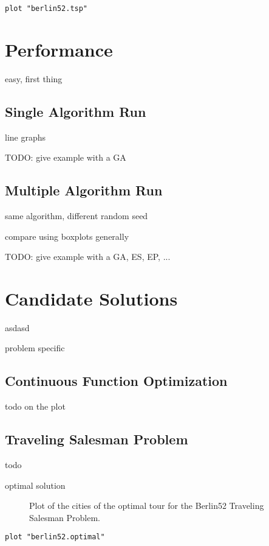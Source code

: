 \documentclass[a4paper, 11pt]{article}
\begin{document}
\begin{lstlisting}[caption=Plot cities from the Berlin52 Traveling Salesman Problem, label=tsp1]
plot "berlin52.tsp"
\end{lstlisting}

%
%
\section{Performance}
easy, first thing

\subsection{Single Algorithm Run}
line graphs

TODO: give example with a GA

\subsection{Multiple Algorithm Run}
same algorithm, different random seed

compare using boxplots generally

TODO: give example with a GA, ES, EP, ...


%
%
\section{Candidate Solutions}
asdasd

problem specific

\subsection{Continuous Function Optimization}
todo
on the plot

\subsection{Traveling Salesman Problem}
todo


optimal solution

\begin{figure}[htp]

\caption{Plot of the cities of the optimal tour for the Berlin52 Traveling Salesman Problem.}
\label{plot:tsp2}
\end{figure}

\begin{lstlisting}[caption=Plot cities and draw optimal tour from the Berlin52 Traveling Salesman Problem, label=tsp2]
plot "berlin52.optimal"
\end{lstlisting}
\end{document}
